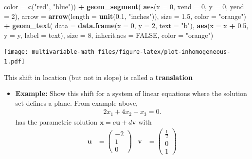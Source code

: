 \documentclass[
]{book}
\newenvironment{Shaded}{\begin{snugshade}}{\end{snugshade}}
\newcommand{\DataTypeTok}[1]{\textcolor[rgb]{0.13,0.29,0.53}{#1}}
\newcommand{\DecValTok}[1]{\textcolor[rgb]{0.00,0.00,0.81}{#1}}
\newcommand{\FloatTok}[1]{\textcolor[rgb]{0.00,0.00,0.81}{#1}}
\newcommand{\KeywordTok}[1]{\textcolor[rgb]{0.13,0.29,0.53}{\textbf{#1}}}
\newcommand{\NormalTok}[1]{#1}
\newcommand{\OperatorTok}[1]{\textcolor[rgb]{0.81,0.36,0.00}{\textbf{#1}}}
\newcommand{\OtherTok}[1]{\textcolor[rgb]{0.56,0.35,0.01}{#1}}
\newcommand{\StringTok}[1]{\textcolor[rgb]{0.31,0.60,0.02}{#1}}
\providecommand{\tightlist}{%
  \setlength{\itemsep}{0pt}\setlength{\parskip}{0pt}}
\theoremstyle{definition}
\theoremstyle{definition}
\theoremstyle{definition}
\theoremstyle{definition}
\theoremstyle{remark}
\begin{document}
\begin{Shaded}
\begin{Highlighting}[]
        \DataTypeTok{color =} \KeywordTok{c}\NormalTok{(}\StringTok{"red"}\NormalTok{, }\StringTok{"blue"}\NormalTok{)) }\OperatorTok{+}
\StringTok{    }\KeywordTok{geom_segment}\NormalTok{(}
        \KeywordTok{aes}\NormalTok{(}\DataTypeTok{x =} \DecValTok{0}\NormalTok{, }\DataTypeTok{xend =} \DecValTok{0}\NormalTok{, }\DataTypeTok{y =} \DecValTok{0}\NormalTok{, }\DataTypeTok{yend =} \DecValTok{2}\NormalTok{),}
        \DataTypeTok{arrow =} \KeywordTok{arrow}\NormalTok{(}\DataTypeTok{length =} \KeywordTok{unit}\NormalTok{(}\FloatTok{0.1}\NormalTok{, }\StringTok{"inches"}\NormalTok{)), }
        \DataTypeTok{size =} \FloatTok{1.5}\NormalTok{, }\DataTypeTok{color =} \StringTok{"orange"}\NormalTok{) }\OperatorTok{+}
\StringTok{    }\KeywordTok{geom_text}\NormalTok{(}
        \DataTypeTok{data =} \KeywordTok{data.frame}\NormalTok{(}\DataTypeTok{x =} \DecValTok{0}\NormalTok{, }\DataTypeTok{y =} \DecValTok{2}\NormalTok{, }\DataTypeTok{text =} \StringTok{"b"}\NormalTok{),}
        \KeywordTok{aes}\NormalTok{(}\DataTypeTok{x =}\NormalTok{ x }\OperatorTok{+}\StringTok{ }\FloatTok{0.5}\NormalTok{, }\DataTypeTok{y =}\NormalTok{ y, }\DataTypeTok{label =}\NormalTok{ text), }
        \DataTypeTok{size =} \DecValTok{8}\NormalTok{, }\DataTypeTok{inherit.aes =} \OtherTok{FALSE}\NormalTok{,}
        \DataTypeTok{color =} \StringTok{"orange"}\NormalTok{) }
\end{Highlighting}
\end{Shaded}

\texttt{[image: multivariable-math\_files/figure-latex/plot-inhomogeneous-1.pdf]}

This shift in location (but not in slope) is called a \textbf{translation}

\begin{itemize}
\tightlist
\item
  \textbf{Example:} Show this shift for a system of linear equations where the solution set defines a plane. From example above,
  \[
  \begin{aligned}
  2x_1 + 4 x_2 - x_3 = 0.
  \end{aligned}
  \]
  has the parametric solution \(\mathbf{x} = c \mathbf{u} + d \mathbf{v}\) with
  \[
  \begin{aligned}
  \mathbf{u} & = \begin{pmatrix} -2 \\ 1 \\ 0 \end{pmatrix} &
  \mathbf{v} & = \begin{pmatrix} \frac{1}{2} \\ 0 \\ 1 \end{pmatrix}
  \end{aligned}
  \]
\end{itemize}
\end{document}
